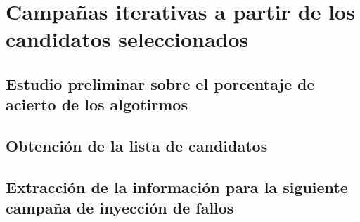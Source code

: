\chapter{Campañas iterativas a partir de los candidatos seleccionados}
\label{ch:CampanasIterativas}

\lettrine[lraise=-0.1, lines=2, loversize=0.2]{}{}



\section{Estudio preliminar sobre el porcentaje de acierto de los algotirmos}
\label{sec:EstudioAcierto}


\section{Obtención de la lista de candidatos}
\label{sec:Candidatos}



\section{Extracción de la información para la siguiente campaña de inyección de
fallos}
\label{sec:InfoCampana}


